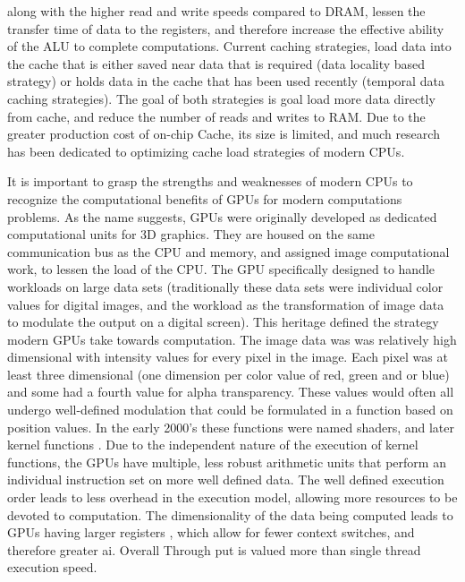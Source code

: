 along with the higher read and write speeds compared to \Gls{DRAM}, lessen the transfer
time of data to the registers, and therefore increase the effective ability of the
 \Gls{ALU} to complete computations. Current caching strategies, load data into
 the cache that is either saved near data that is required (data locality based strategy)
 or holds data in the cache that has been used recently (temporal data caching strategies).
 The goal of both strategies is goal load more data directly from cache, and reduce
 the number of reads and writes to \gls{RAM}.
Due to the greater production cost of on-chip Cache, its size is limited, and
much research has been dedicated to optimizing cache load strategies of modern CPUs.
\par

It is important to grasp the strengths and weaknesses of modern \Glspl{CPU} to
recognize the computational benefits of \Glspl{GPU}
for modern computations problems.  As the name suggests, \Glspl{GPU} were originally developed
as dedicated computational units for 3D graphics\cite{Sanders}.  They are housed on the same
communication bus as the \Gls{CPU} and memory, and assigned image computational work,
to lessen the load of the \Gls{CPU}.
The GPU specifically designed to handle workloads on large data sets (traditionally these
data sets were individual color values for digital images, and the workload as
the transformation of image data to modulate the output on a digital screen).
This heritage defined the strategy modern GPUs take towards computation.
The image data was was relatively high dimensional with intensity values for every pixel in the image.
Each pixel was at least three dimensional (one dimension per color value of red, green and or blue) and
some had a fourth value for alpha transparency. These values would often all undergo
well-defined modulation that could be formulated in a function based on position values.
In the early 2000's these functions were named shaders, and later kernel functions \cite{5751939}.
Due to the independent nature of the execution of kernel functions, the GPUs have multiple, less robust
arithmetic units that perform an individual instruction set on more well defined data.
The well defined execution order leads to less overhead in the execution
model, allowing more resources to be devoted to computation.
The dimensionality of the data being computed leads to \Glspl{GPU} having larger registers \cite{5751939},
which allow for fewer context switches, and therefore greater \gls{ai}.  Overall
Through put is valued more than single thread execution speed.  %

